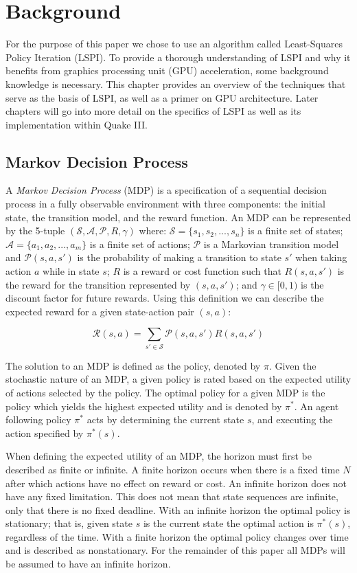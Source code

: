 \chapter{Background}

For the purpose of this paper we chose to use an algorithm called Least-Squares Policy Iteration (LSPI). To provide a thorough understanding of LSPI and why it benefits from graphics processing unit (GPU) acceleration, some background knowledge is necessary. This chapter provides an overview of the techniques that serve as the basis of LSPI, as well as a primer on GPU architecture. Later chapters will go into more detail on the specifics of LSPI as well as its implementation within Quake III.

\section{Markov Decision Process}

A \emph{Markov Decision Process} (MDP) \cite{norvig} is a specification of a sequential decision process in a fully observable environment with three components: the initial state, the transition model, and the reward function. An MDP can be represented by the 5-tuple $(\mathcal{S, A, P}, R, \gamma)$ where: $\mathcal{S} = \{s_1, s_2, ..., s_n\}$ is a finite set of states; $\mathcal{A} = \{a_1, a_2, ..., a_m\}$ is a finite set of actions; $\mathcal{P}$ is a Markovian transition model and $\mathcal{P}(s, a, s')$ is the probability of making a transition to state $s'$ when taking action $a$ while in state $s$; $R$ is a reward or cost function such that $R(s, a, s')$ is the reward for the transition represented by $(s, a, s')$; and $\gamma \in [0, 1)$ is the discount factor for future rewards. Using this definition we can describe the expected reward for a given state-action pair $(s, a)$:

\[
    \mathcal{R}(s, a) = \sum_{s' \in \mathcal{S}} \mathcal{P}(s, a, s')R(s, a, s')
\]

The solution to an MDP is defined as the policy, denoted by $\pi$. Given the stochastic nature of an MDP, a given policy is rated based on the expected utility of actions selected by the policy. The optimal policy for a given MDP is the policy which yields the highest expected utility and is denoted by $\pi^*$. An agent following policy $\pi^*$ acts by determining the current state $s$, and executing the action specified by $\pi^*(s)$.

When defining the expected utility of an MDP, the horizon must first be described as finite or infinite. A finite horizon occurs when there is a fixed time $N$ after which actions have no effect on reward or cost. An infinite horizon does not have any fixed limitation. This does not mean that state sequences are infinite, only that there is no fixed deadline. With an infinite horizon the optimal policy is stationary; that is, given state $s$ is the current state the optimal action is $\pi^*(s)$, regardless of the time. With a finite horizon the optimal policy changes over time and is described as nonstationary. For the remainder of this paper all MDPs will be assumed to have an infinite horizon.

